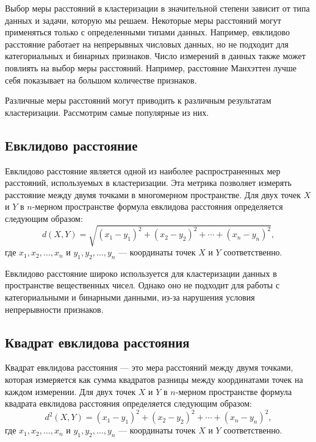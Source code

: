 Выбор меры расстояний в кластеризации в значительной степени зависит от типа данных и задачи, которую мы решаем. Некоторые меры расстояний могут применяться только с определенными типами данных. Например, евклидово расстояние работает на непрерывных числовых данных, но не подходит для категориальных и бинарных признаков. Число измерений в данных также может повлиять на выбор меры расстояний. Например, расстояние Манхэттен лучше себя показывает на большом количестве признаков. 

Различные меры расстояний могут приводить к различным результатам кластеризации. Рассмотрим самые популярные из них.

\subsection{Евклидово расстояние}

Евклидово расстояние \cite{EuclideanDistance} является одной из наиболее распространенных мер расстояний, используемых в кластеризации. Эта метрика позволяет измерять расстояние между двумя точками в многомерном пространстве. Для двух точек $X$ и $Y$ в $n$-мерном пространстве формула евклидова расстояния определяется следующим образом:
\begin{equation}
    d(X,Y) = \sqrt{(x_1-y_1)^2 + (x_2-y_2)^2 + \cdots + (x_n - y_n)^2},
\end{equation}
где $x_1, x_2, \ldots, x_n$ и $y_1, y_2, \ldots, y_n$ --- координаты точек $X$ и $Y$ соответственно.

Евклидово расстояние широко используется для кластеризации данных в пространстве вещественных чисел. Однако оно не подходит для работы с категориальными и бинарными данными, из-за нарушения условия непрерывности признаков.

\subsection{Квадрат евклидова расстояния}

Квадрат евклидова расстояния \cite{EuclideanDistance} --- это мера расстояний между двумя точками, которая измеряется как сумма квадратов разницы между координатами точек на каждом измерении. Для двух точек $X$ и $Y$ в $n$-мерном пространстве формула квадрата евклидова расстояния определяется следующим образом:
\begin{equation}
    d^2(X,Y) = (x_1-y_1)^2 + (x_2-y_2)^2 + \cdots + (x_n-y_n)^2,
\end{equation}
где $x_1,x_2,\ldots,x_n$ и $y_1,y_2,\ldots,y_n$ --- координаты точек $X$ и $Y$ соответственно.

